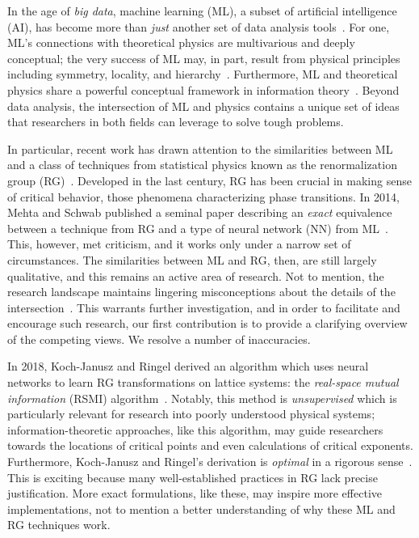 In the age of \textit{big data}, machine learning (ML), a subset of
artificial intelligence (AI), has become more than \textit{just}
another set of data analysis tools~\cite{deep-learning}. For one, ML's
connections with theoretical physics are multivarious and deeply
conceptual; the very success of ML may, in part, result from physical
principles including symmetry, locality, and
hierarchy~\cite{lin}. Furthermore, ML and theoretical physics share a
powerful conceptual framework in information
theory~\cite{tishby}. Beyond data analysis, the intersection of ML and
physics contains a unique set of ideas that researchers in both fields
can leverage to solve tough problems.

In particular, recent work has drawn attention to the similarities
between ML and a class of techniques from statistical physics known as
the renormalization group (RG)~\cite{mehta,kjr,iso,lin}. Developed in
the last century, RG has been crucial in making sense of critical
behavior, those phenomena characterizing phase transitions. In 2014,
Mehta and Schwab published a seminal paper describing an
\textit{exact} equivalence between a technique from RG and a type of
neural network (NN) from ML~\cite{mehta}. This, however, met
criticism, and it works only under a narrow set of circumstances. The
similarities between ML and RG, then, are still largely qualitative,
and this remains an active area of research. Not to mention, the
research landscape maintains lingering misconceptions about the
details of the intersection~\cite{iso, lin, mehta-reply, hoeve}. This
warrants further investigation, and in order to facilitate and
encourage such research, our first contribution is to provide a
clarifying overview of the competing views. We resolve a number of
inaccuracies.

In 2018, Koch-Janusz and Ringel derived an algorithm which uses neural
networks to learn RG transformations on lattice systems: the
\textit{real-space mutual information} (RSMI)
algorithm~\cite{kjr}. Notably, this method is \textit{unsupervised}
which is particularly relevant for research into poorly understood
physical systems; information-theoretic approaches, like this
algorithm, may guide researchers towards the locations of critical
points and even calculations of critical exponents. Furthermore,
Koch-Janusz and Ringel's derivation is \textit{optimal} in a rigorous
sense~\cite{kjr,lenggenhager}. This is
exciting because many well-established practices in RG lack precise
justification. More exact formulations, like these, may inspire more
effective implementations, not to mention a better understanding of
why these ML and RG techniques work.

